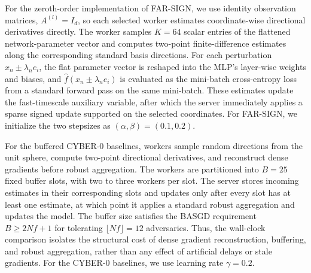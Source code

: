 \documentclass{article}
\newcommand{\farsign}{FAR-SIGN\xspace}
\begin{document}
For the zeroth-order implementation of \farsign{}, we use identity observation matrices, $A^{(l)}=I_d$, so each selected worker estimates coordinate-wise directional derivatives directly. 
The worker samples $K=64$ scalar entries of the flattened network-parameter vector and computes two-point finite-difference estimates along the corresponding standard basis directions. 
For each perturbation $x_n \pm \lambda_n e_i$, the flat parameter vector is reshaped into the MLP's layer-wise weights and biases, and $\hat f(x_n \pm \lambda_n e_i)$ is evaluated as the mini-batch cross-entropy loss from a standard forward pass on the same mini-batch. 
These estimates update the fast-timescale auxiliary variable, after which the server immediately applies a sparse signed update supported on the selected coordinates. 
For \farsign{}, we initialize the two stepsizes as $(\alpha,\beta)=(0.1,0.2)$.



For the buffered CYBER-0 baselines, workers sample random directions from the unit sphere, compute two-point directional derivatives, and reconstruct dense gradients before robust aggregation. 
The workers are partitioned into $B=25$ fixed buffer slots, with two to three workers per slot. 
The server stores incoming estimates in their corresponding slots and updates only after every slot has at least one estimate, at which point it applies a standard robust aggregation and updates the model. 
The buffer size satisfies the BASGD requirement $B \geq 2Nf+1$ for tolerating $\lfloor Nf \rfloor = 12$ adversaries. 
Thus, the wall-clock comparison isolates the structural cost of dense gradient reconstruction, buffering, and robust aggregation, rather than any effect of artificial delays or stale gradients. 
For the CYBER-0 baselines, we use learning rate $\gamma=0.2$.


\end{document}
